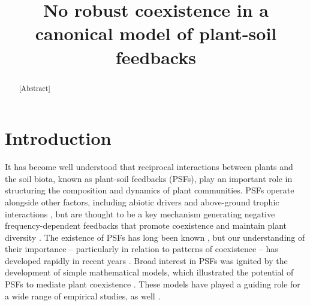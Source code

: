 \documentclass[11pt]{article}
\title{No robust coexistence in a canonical model of plant-soil feedbacks}
\begin{document}
\maketitle
{}
\linenumbers

\begin{abstract}
  [Abstract]
\end{abstract}

\section{Introduction}

It has become well understood that reciprocal interactions between plants and the soil biota, known as plant-soil feedbacks (PSFs), play an important role in structuring the composition and dynamics of plant communities. PSFs operate alongside other factors, including abiotic drivers \cite{bennett2019mechanisms} and above-ground trophic interactions \cite{van2009empirical}, but are thought to be a key mechanism generating negative frequency-dependent feedbacks that promote coexistence and maintain plant diversity \cite{kulmatiski2008plant,van2013plant,bever2015maintenance}. The existence of PSFs has long been known \cite{van1993plant,bever1994feedback}, but our understanding of their importance -- particularly in relation to patterns of coexistence -- has developed rapidly in recent years \cite{klironomos2002feedback,petermann2008janzen,mangan2010negative}. Broad interest in PSFs was ignited by the development of simple mathematical models, which illustrated the potential of PSFs to mediate plant coexistence \cite{bever1997incorporating,bever2003soil,ke2015incorporating}. These models have played a guiding role for a wide range of empirical studies, as well \cite{kulmatiski2008plant,kulmatiski2011testing,pernilla2010plant}.
\end{document}
